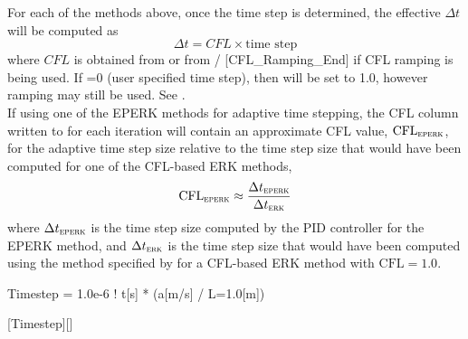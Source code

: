 \begin{nmldescbody}
\vspace{1.0ex}\noindent\NOTE
For each of the methods above,
once the time step is determined, the effective $\Delta t$ will be computed as
\begin{equation}
  \Delta t = CFL \times \text{time step}
\end{equation}
where $CFL$ is obtained from
or from
  /%
  [CFL\_Ramping\_End]
if CFL ramping is being used.
%
If =0 (user specified time step), then
 will be set to 1.0,
however ramping may still be used.
See .
\\ %

\noindent\NOTE
If using one of the EPERK methods for adaptive time stepping, the CFL column
written to  for each iteration will contain an approximate CFL
value, $\text{CFL}_\textsc{eperk}$, for the adaptive time step size relative
to the time step size that would have been computed for one of the CFL-based
ERK methods, \thatis
%
\[
  \text{CFL}_\textsc{eperk} \approx
                   \frac{\Delta t_\textsc{eperk}}{\Delta t_\textsc{erk}}
\]
%
where $\Delta t_\textsc{eperk}$ is the time step size computed by the PID
controller for the EPERK method, and $\Delta t_\textsc{erk}$ is the time step
size that would have been computed using the method specified by
 for a CFL-based ERK method with $\text{CFL}=1.0$.

\end{nmldescbody}


\begin{nmldescitem}
Timestep = 1.0e-6  ! t[s] * (a[m/s] / L=1.0[m])
\end{nmldescitem}
[Timestep][]

